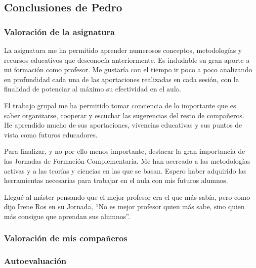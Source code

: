 \subsection{Conclusiones de Pedro}
\begin{leftbar}{\pedrocolor}

\subsubsection{Valoración de la asignatura}

La asignatura me ha permitido aprender numerosos conceptos, metodologías y recursos educativos que desconocía anteriormente. Es indudable su gran aporte a mi formación como profesor. Me gustaría con el tiempo ir poco a poco analizando en profundidad cada una de las aportaciones realizadas en cada sesión, con la finalidad de potenciar al máximo su efectividad en el aula. 

El trabajo grupal me ha permitido tomar conciencia de lo importante que es saber organizarse, cooperar y escuchar las sugerencias del resto de compañeros. He aprendido mucho de sus aportaciones, vivencias educativas y sus puntos de vista como futuros educadores.

Para finalizar, y no por ello menos importante, destacar la gran importancia de las Jornadas de Formación Complementaria. Me han acercado a las metodologías activas y a las teorías y ciencias en las que se basan. Espero haber adquirido las herramientas necesarias para trabajar en el aula con mis futuros alumnos. 

Llegué al máster pensando que el mejor profesor era el que más sabía, pero como dijo Irene Ros en su Jornada, “No es mejor profesor quien más sabe, sino quien más consigue que aprendan sus alumnos”.

\subsubsection{Valoración de mis compañeros}

\subsubsection{Autoevaluación}



\end{leftbar}

